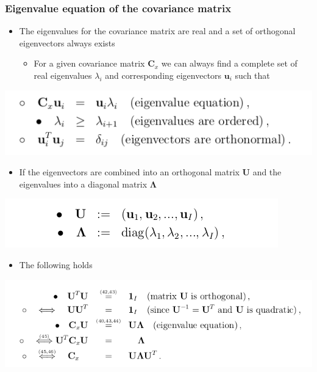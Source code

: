 \documentclass[11pt]{article}
\begin{document}
\subsubsection{Eigenvalue equation of the covariance matrix}
\label{sec:org666bee3}
\begin{itemize}
\item The eigenvalues for the covariance matrix are real and a set of orthogonal eigenvectors always exists
\begin{itemize}
\item For a given covariance matrix \(\pmb C_x\) we can always find a complete set of real eigenvalues \(\lambda_i\) and corresponding eigenvectors \(\pmb u_i\) such that
\end{itemize}
\end{itemize}
\begin{center}
\includegraphics[width=.9\linewidth]{Principal Component Analysis/screenshot_2018-11-20_21-47-41.png}
\end{center}

\begin{itemize}
\item If the eigenvectors are combined into an orthogonal matrix \(\pmb U\) and the eigenvalues into a diagonal matrix \(\pmb \Lambda\)
\end{itemize}
\begin{center}
\includegraphics[width=.9\linewidth]{Principal Component Analysis/screenshot_2018-11-20_21-48-40.png}
\end{center}

\begin{itemize}
\item The following holds
\end{itemize}
\begin{center}
\includegraphics[width=.9\linewidth]{Principal Component Analysis/screenshot_2018-11-20_21-48-59.png}
\end{center}
\end{document}
